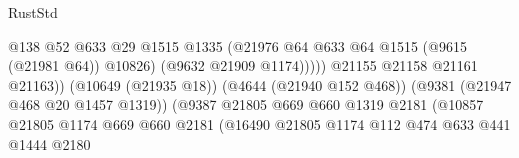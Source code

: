 \begin{lexlean}{RustStd}
\begin{coremodule}
                                                            @138
                                                            @52
                                                            @633
                                                            @29
                                                            @1515
                                                            @1335
                                                            (@21976
                                                              @64
                                                              @633
                                                              @64
                                                              @1515
                                                              (@9615 (@21981 @64))
                                                              @10826)
                                                            (@9632 @21909 @1174)))))
                                                    @21155
                                                    @21158
                                                    @21161
                                                    @21163))
                                                (@10649 (@21935 @18))
                                                (@4644 (@21940 @152 @468))
                                                (@9381 (@21947 @468 @20 @1457 @1319))
                                                (@9387
                                                  @21805
                                                  @669
                                                  @660
                                                  @1319
                                                  @2181
                                                  (@10857
                                                    @21805
                                                    @1174
                                                    @669
                                                    @660
                                                    @2181
                                                    (@16490
                                                      @21805
                                                      @1174
                                                      @112
                                                      @474
                                                      @633
                                                      @441
                                                      @1444
                                                      @2180

\end{coremodule}
\end{lexlean}
